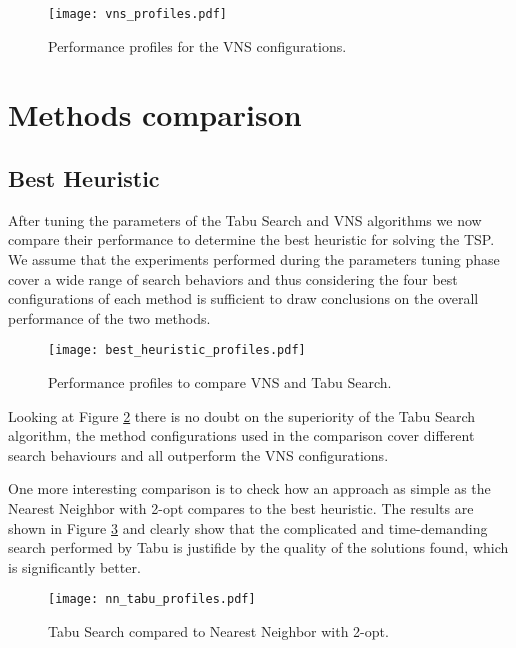 \begin{figure}[H]
  \centering
  \texttt{[image: vns\_profiles.pdf]}
  \caption{Performance profiles for the VNS configurations.}
  \label{fig:vns-profiles}
\end{figure}

\section{Methods comparison}

\subsection{Best Heuristic}

After tuning the parameters of the Tabu Search and VNS algorithms we now compare their performance to determine the best heuristic for solving the TSP. We assume that the experiments performed during the parameters tuning phase cover a wide range of search behaviors and thus considering the four best configurations of each method is sufficient to draw conclusions on the overall performance of the two methods.

\begin{figure}[h]
  \centering
  \texttt{[image: best\_heuristic\_profiles.pdf]}
  \caption{Performance profiles to compare VNS and Tabu Search.}
  \label{fig:best-heuristic-profiles}
\end{figure}

Looking at Figure \ref{fig:best-heuristic-profiles} there is no doubt on the superiority of the Tabu Search algorithm, the method configurations used in the comparison cover different search behaviours and all outperform the VNS configurations.

One more interesting comparison is to check how an approach as simple as the Nearest Neighbor with 2-opt compares to the best heuristic. The results are shown in Figure \ref{fig:nn-vs-best-heuristic} and clearly show that the complicated and time-demanding search performed by Tabu is justifide by the quality of the solutions found, which is significantly better.

\begin{figure}[h]
  \centering
  \texttt{[image: nn\_tabu\_profiles.pdf]}
  \caption{Tabu Search compared to Nearest Neighbor with 2-opt.}
  \label{fig:nn-vs-best-heuristic}
\end{figure}
